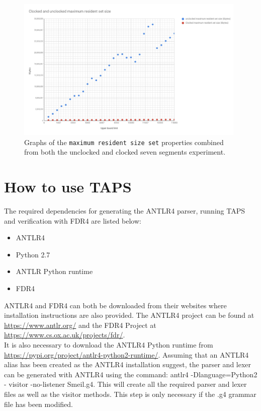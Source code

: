\begin{figure}
    \includegraphics[width=0.98\textwidth]{./figures/temporary_figures/combined_maximum_resident_set_size.jpg}
\caption{Graphs of the \texttt{maximum resident size set} properties combined from both the unclocked and clocked seven segments experiment.}
\label{fig:combined_resident_size}
\end{figure}







\newpage
\section{How to use TAPS}
The required dependencies for generating the ANTLR4 parser, running TAPS and verification with FDR4 are listed below:
\begin{itemize}
    \item ANTLR4
    \item Python 2.7
    \item ANTLR Python runtime
    \item FDR4
\end{itemize}

ANTLR4 and FDR4 can both be downloaded from their websites where installation instructions are also provided.
The ANTLR4 project can be found at \url{https://www.antlr.org/} and the FDR4 Project at \url{https://www.cs.ox.ac.uk/projects/fdr/}.\\
It is also necessary to download the ANTLR4 Python runtime from \url{https://pypi.org/project/antlr4-python2-runtime/}.
Assuming that an ANTLR4 alias has been created as the ANTLR4 installation suggest, the parser and lexer can be generated with ANTLR4 using the command: {\ttfamily antlr4 -Dlanguage=Python2 - visitor -no-listener Smeil.g4.}
This will create all the required parser and lexer files as well as the visitor methods. This step is only necessary if the .g4 grammar file has been modified.\\

